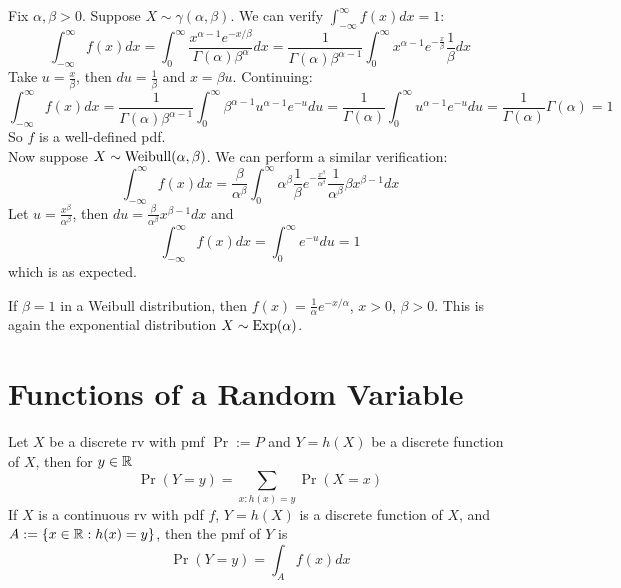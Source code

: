 \documentclass[11pt,fleqn]{book} %
\begin{document}
\begin{example}
Fix \(\alpha, \beta > 0\). Suppose \(X \sim \gamma(\alpha, \beta)\). We can verify \(\int_{-\infty}^\infty f(x)dx = 1\):
\[
\int_{-\infty}^\infty f(x)dx = \int_0^\infty \frac{x^{\alpha-1}e^{-x/\beta}}{\Gamma(\alpha)\beta^\alpha}dx = \frac{1}{\Gamma(\alpha)\beta^{\alpha-1}}\int_0^\infty x^{\alpha-1}e^{-\frac{x}{\beta}}\frac1\beta dx
\]
\indent Take \(u = \frac{x}{\beta}\), then \(du = \frac1\beta\) and \(x = \beta u\). Continuing:
\[
\int_{-\infty}^\infty f(x)dx = \frac{1}{\Gamma(\alpha)\beta^{\alpha-1}}\int_0^\infty\beta^{\alpha-1}u^{\alpha-1}e^{-u}du = \frac{1}{\Gamma(\alpha)}\int_0^\infty u^{\alpha-1}e^{-u}du = \frac{1}{\Gamma(\alpha)}\Gamma(\alpha) = 1
\]
\indent So \(f\) is a well-defined pdf. \\
\indent Now suppose \(X \sim \operatorname{Weibull}(\alpha, \beta)\). We can perform a similar verification:
\[
\int_{-\infty}^\infty f(x)dx = \frac{\beta}{\alpha^\beta}\int_0^\infty \alpha^\beta \frac{1}{\beta} e^{-\frac{x^\beta}{\alpha^\beta}}\frac{1}{\alpha^\beta}\beta x^{\beta-1} dx
\]
\indent Let \(u = \frac{x^\beta}{\alpha^\beta}\), then \(du = \frac{\beta}{\alpha^\beta}x^{\beta - 1}dx\) and
\[
\int_{-\infty}^\infty f(x)dx = \int_0^\infty e^{-u}du = 1
\]
which is as expected.
\end{example}

\begin{remark} If \(\beta = 1\) in a Weibull distribution, then \(f(x) = \frac{1}{\alpha}e^{-x/\alpha}\), \(x > 0\), \(\beta > 0\). This is again the exponential distribution \(X \sim \operatorname{Exp}(\alpha)\).
\end{remark}


\section{Functions of a Random Variable}

\begin{definition}
Let \(X\) be a discrete rv with pmf \(\Pr := P\) and \(Y = h(X)\) be a discrete function of \(X\), then for \(y \in \mathbb{R}\)
\[
\Pr(Y = y) = \sum_{x:h(x) = y}\Pr(X = x)
\]
\indent If \(X\) is a continuous rv with pdf \(f\), \(Y = h(X)\) is a discrete function of \(X\), and \(A := \{x \in \mathbb{R}: h(x) = y\}\), then the pmf of \(Y\) is
\[
\Pr(Y = y) = \int_A f(x)dx
\]
\end{definition}
\end{document}
